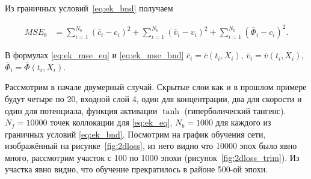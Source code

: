 \documentclass[a4paper,14pt]{extarticle} %
\begin{document}
Из граничных условий~\eqref{eq:ek_bnd} получаем

\begin{equation}\label{eq:ek_mse_bnd}
    \begin{aligned}
        MSE_b & = \sum_{i=1}^{N_b}(\bar{c}_i - c_i)^2 + \sum_{i=1}^{N_b}(\bar{v}_i - v_i)^2 + \sum_{i=1}^{N_b}(\bar{\Phi}_i - c_i)^2.
    \end{aligned}
\end{equation}

В формулах \eqref{eq:ek_mse_eq} и \eqref{eq:ek_mse_bnd} $\bar{c}_i = \bar{c}(t_i, X_i)$, $\bar{v}_i = \bar{v}(t_i, X_i)$, $\bar{\Phi}_i = \bar{\Phi}(t_i, X_i)$.

Рассмотрим в начале двумерный случай. Скрытые слои как и в прошлом примере будут четыре по 20, входной слой 4, один для концентрации, два для скорости и один для потенциала, функция активации $\tanh$ (гиперболический тангенс). $N_f = 10000$ точек коллокации для \eqref{eq:ek_eq}, $N_b=1000$ для каждого из граничных условий \eqref{eq:ek_bnd}. Посмотрим на график обучения сети, изображённый на рисунке~\ref{fig:2dloss}, из него видно что 10000 эпох было явно много, рассмотрим участок с 100 по 1000 эпохи (рисунок~\ref{fig:2dloss_trim}). Из участка явно видно, что обучение прекратилось в районе 500-ой эпохи.
\end{document}
